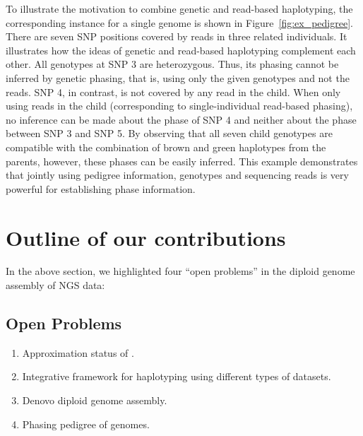 \begin{example}
 To illustrate the motivation to combine genetic and read-based haplotyping, the corresponding \MEC instance for a single genome is shown in Figure~\ref{fig:ex_pedigree}. 
There are seven SNP positions covered by reads in three related individuals. 
It illustrates how the ideas of genetic and read-based haplotyping complement each other. 
All genotypes at SNP 3 are heterozygous. 
Thus, its phasing cannot be inferred by genetic phasing, that is, using only the given genotypes and not the reads. SNP 4, 
in contrast, is not covered by any read in the child. When only using reads in the child (corresponding to single-individual read-based phasing), 
no inference can be made about the phase of SNP 4 and neither about the phase between SNP 3 and SNP 5. 
By observing that all seven child genotypes are compatible with the combination of brown and green haplotypes from the parents, 
however, these phases can be easily inferred. This example demonstrates that jointly using pedigree information, genotypes and sequencing reads is very powerful for establishing phase information.
\end{example}

\section{Outline of our contributions}
In the above section, we highlighted four ``open problems'' in the diploid genome assembly of NGS data:
\subsection{Open Problems}
\begin{enumerate}
 \item Approximation status of \GMEC.
 \item Integrative framework for haplotyping using different types of datasets.
 \item Denovo diploid genome assembly.
 \item Phasing pedigree of genomes.
\end{enumerate}

